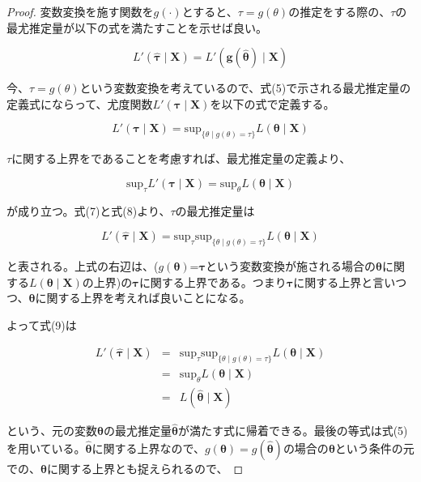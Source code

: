 \documentclass[a4paper,dvipdfmx]{jsarticle}
\begin{document}
\begin{proof}

変数変換を施す関数を$g(\cdot)$とすると、$\tau = g(\theta)$の推定をする際の、$\tau$の最尤推定量が以下の式を満たすことを示せば良い。

\begin{equation}
  L'(\bm{\hat{\tau}} \mid \bm{X}) = L'(\bm{g(\hat{\theta})} \mid \bm{X})
\end{equation}

今、$\tau=g(\theta)$という変数変換を考えているので、式(5)で示される最尤推定量の定義式にならって、尤度関数$L'(\bm{\tau} \mid \bm{X})$を以下の式で定義する。

\begin{equation}
  L'(\bm{\tau} \mid \bm{X}) = \mathrm{sup}_{\{ \theta \mid g(\theta)=\tau \}} L(\bm{\theta} \mid \bm{X})
\end{equation}


$\tau$に関する上界をであることを考慮すれば、最尤推定量の定義より、

\begin{equation}
\mathrm{sup}_\tau L'(\bm{\tau} \mid \bm{X}) = \mathrm{sup}_\theta L(\bm{\theta} \mid \bm{X})
\end{equation}

が成り立つ。式(7)と式(8)より、$\tau$の最尤推定量は


\begin{equation}
L'(\bm{\hat{\tau}} \mid \bm{X}) = \mathrm{sup}_\tau \mathrm{sup}_{\{ \theta \mid g(\theta)=\tau \}} L(\bm{\theta} \mid \bm{X})
\end{equation}

と表される。上式の右辺は、($g(\bm{\theta})$=$\bm{\tau}$という変数変換が施される場合の$\bm{\theta}$に関する$L(\bm{\theta} \mid \bm{X})$の上界)の$\bm{\tau}$に関する上界である。つまり$\bm{\tau}$に関する上界と言いつつ、$\bm{\theta}$に関する上界を考えれば良いことになる。

よって式(9)は

\begin{eqnarray*}
L'(\bm{\hat{\tau}} \mid \bm{X}) &=& \mathrm{sup}_\tau \mathrm{sup}_{\{ \theta \mid g(\theta)=\tau \}} L(\bm{\theta} \mid \bm{X})\\
&=& \mathrm{sup}_\theta L(\bm{\theta} \mid \bm{X}) \\
&=&L(\hat{\bm{\theta}} \mid \bm{X})
\end{eqnarray*}

という、元の変数$\bm{\theta}$の最尤推定量$\bm{\hat{\theta}}$が満たす式に帰着できる。最後の等式は式(5)を用いている。$\bm{\hat{\theta}}$に関する上界なので、$g(\bm{\theta})=g(\bm{\hat{\theta}})$の場合の$\bm{\theta}$という条件の元での、$\bm{\theta}$に関する上界とも捉えられるので、


\end{proof}
\end{document}
